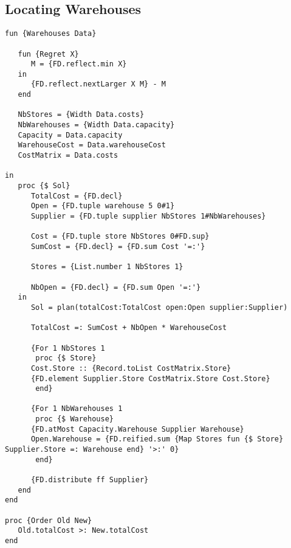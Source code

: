 \subsection{Locating Warehouses}
\begin{lstlisting}[language=Oz]
fun {Warehouses Data}
   
   fun {Regret X}
      M = {FD.reflect.min X}
   in
      {FD.reflect.nextLarger X M} - M
   end

   NbStores = {Width Data.costs}
   NbWarehouses = {Width Data.capacity}
   Capacity = Data.capacity
   WarehouseCost = Data.warehouseCost
   CostMatrix = Data.costs
   
in
   proc {$ Sol}
      TotalCost = {FD.decl}
      Open = {FD.tuple warehouse 5 0#1}
      Supplier = {FD.tuple supplier NbStores 1#NbWarehouses}

      Cost = {FD.tuple store NbStores 0#FD.sup}
      SumCost = {FD.decl} = {FD.sum Cost '=:'}

      Stores = {List.number 1 NbStores 1}

      NbOpen = {FD.decl} = {FD.sum Open '=:'}
   in
      Sol = plan(totalCost:TotalCost open:Open supplier:Supplier)

      TotalCost =: SumCost + NbOpen * WarehouseCost

      {For 1 NbStores 1
       proc {$ Store}
	  Cost.Store :: {Record.toList CostMatrix.Store}
	  {FD.element Supplier.Store CostMatrix.Store Cost.Store}
       end}

      {For 1 NbWarehouses 1
       proc {$ Warehouse}
	  {FD.atMost Capacity.Warehouse Supplier Warehouse}
	  Open.Warehouse = {FD.reified.sum {Map Stores fun {$ Store} Supplier.Store =: Warehouse end} '>:' 0}
       end}
      
      {FD.distribute ff Supplier}
   end
end

proc {Order Old New}
   Old.totalCost >: New.totalCost
end
\end{lstlisting}
